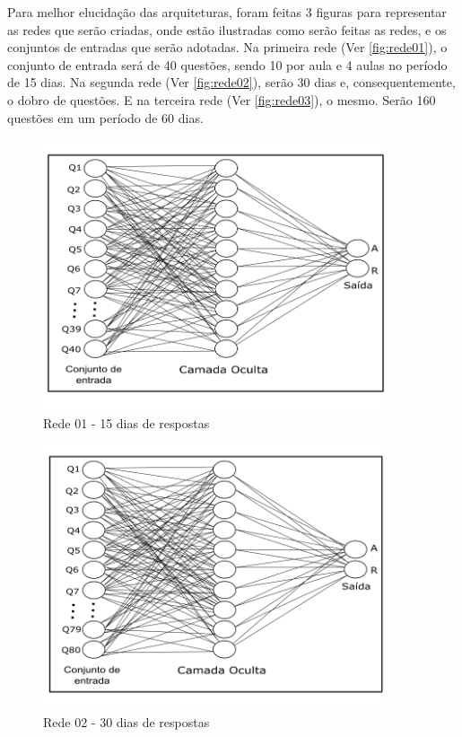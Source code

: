Para melhor elucidação das arquiteturas, foram feitas 3 figuras para representar as redes que serão criadas, onde estão ilustradas como serão feitas as redes, e os conjuntos de entradas que serão adotadas. Na primeira rede (Ver \autoref{fig:rede01}), o conjunto de entrada será de 40 questões, sendo 10 por aula e 4 aulas no período de 15 dias. Na segunda rede (Ver \autoref{fig:rede02}), serão 30 dias e, consequentemente, o dobro de questões. E na terceira rede (Ver \autoref{fig:rede03}), o mesmo. Serão 160 questões em um período de 60 dias.

\begin{figure}
    \centering
    \includegraphics[width=0.9\textwidth]{modelo-monografia-rej-2018/img/rede01_15.png}
    \caption{Rede 01 - 15 dias de respostas}
    \label{fig:rede01}
\end{figure}

\begin{figure}
    \centering
    \includegraphics[width=0.9\textwidth]{modelo-monografia-rej-2018/img/rede02_30.png}
    \caption{Rede 02 - 30 dias de respostas}
    \label{fig:rede02}
\end{figure}

